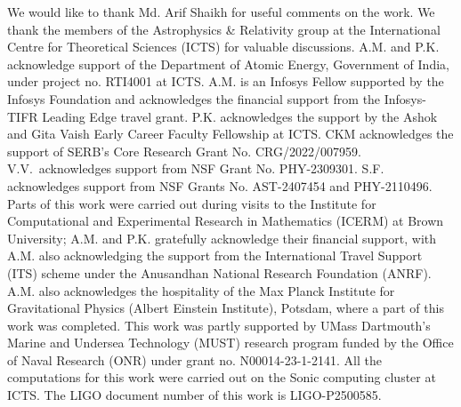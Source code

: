 \documentclass[reprint, superscriptaddress, amsmath, amssymb, aps, prl floatfix]{revtex4-2}
\begin{document}
\begin{acknowledgments}
We would like to thank Md. Arif Shaikh for useful comments on the work. We thank the members of the Astrophysics \& Relativity group at the International Centre for Theoretical Sciences (ICTS) for valuable discussions. A.M. and P.K. acknowledge support of the Department of Atomic Energy, Government of India, under project no. RTI4001 at ICTS. A.M. is an Infosys Fellow supported by the Infosys Foundation and acknowledges the financial support from the Infosys-TIFR Leading Edge travel grant. P.K. acknowledges the support by the Ashok and Gita Vaish Early Career Faculty Fellowship at ICTS.  
CKM acknowledges the support of SERB’s Core Research Grant No. CRG/2022/007959.
V.V.~acknowledges support from NSF Grant No. PHY-2309301.
S.F. acknowledges support from NSF Grants No. AST-2407454 and PHY-2110496.
Parts of this work were carried out during visits to the Institute for Computational and Experimental Research in Mathematics (ICERM) at Brown University; A.M. and P.K. gratefully acknowledge their financial support, with A.M. also acknowledging the support from the International Travel Support (ITS) scheme under the Anusandhan National Research Foundation (ANRF). A.M. also acknowledges the hospitality of the Max Planck Institute for Gravitational Physics (Albert Einstein Institute), Potsdam, where a part of this work was completed.
This work was partly supported by UMass Dartmouth's Marine and Undersea Technology (MUST) research program funded by the Office of Naval Research (ONR) under grant no. N00014-23-1-2141.
All the computations for this work were carried out on the Sonic computing cluster at ICTS. The LIGO document number of this work is LIGO-P2500585. 
\end{acknowledgments}




\appendix

\end{document}
